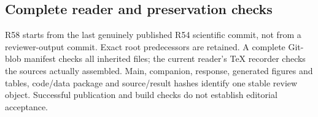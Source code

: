 \subsection{Complete reader and preservation checks}
R58 starts from the last genuinely published R54 scientific commit, not from a reviewer-output commit. Exact root predecessors are retained. A complete Git-blob manifest checks all inherited files; the current reader's TeX recorder checks the sources actually assembled. Main, companion, response, generated figures and tables, code/data package and source/result hashes identify one stable review object. Successful publication and build checks do not establish editorial acceptance.
